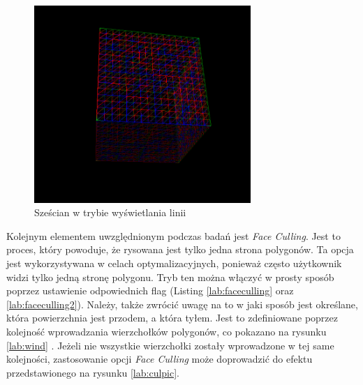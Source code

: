 \documentclass[archive]{mgr}
\begin{document}
\begin{figure}[h!]
  \centering
    \includegraphics[width=0.73\textwidth]{images/wire.png}
   \caption{Sześcian w trybie wyświetlania linii}
   \label{lab:wirepic}
\end{figure}

Kolejnym elementem uwzględnionym podczas badań jest \emph{Face Culling}. Jest to proces, który powoduje, że rysowana jest tylko jedna strona polygonów. Ta opcja jest wykorzystywana w celach optymalizacyjnych, ponieważ często użytkownik widzi tylko jedną stronę polygonu. Tryb ten można włączyć w prosty sposób poprzez ustawienie odpowiednich flag (Listing \ref{lab:faceculling} oraz \ref{lab:faceculling2}). Należy, także zwrócić uwagę na to w jaki sposób jest określane, która powierzchnia jest przodem, a która tyłem. Jest to zdefiniowane poprzez kolejność wprowadzania wierzchołków polygonów, co pokazano na rysunku \ref{lab:wind} \cite{facecull}. Jeżeli nie wszystkie wierzchołki zostały wprowadzone w tej same kolejności, zastosowanie opcji \emph{Face Culling} może doprowadzić do efektu przedstawionego na rysunku \ref{lab:culpic}.
\end{document}
